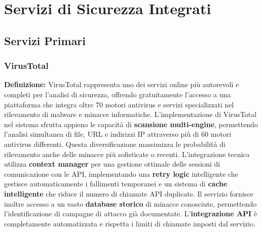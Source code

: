 \documentclass{article}
\begin{document}
\section{Servizi di Sicurezza Integrati}

\subsection{Servizi Primari}

\subsubsection{VirusTotal}
\textbf{Definizione:} VirusTotal rappresenta uno dei servizi online più autorevoli e completi per l'analisi di sicurezza, offrendo gratuitamente l'accesso a una piattaforma che integra oltre 70 motori antivirus e servizi specializzati nel rilevamento di malware e minacce informatiche.
\newline \newline
L'implementazione di VirusTotal nel sistema sfrutta appieno le capacità di \textbf{scansione multi-engine}, permettendo l'analisi simultanea di file, URL e indirizzi IP attraverso più di 60 motori antivirus differenti. Questa diversificazione massimizza le probabilità di rilevamento anche delle minacce più sofisticate o recenti.
\newline \newline
L'integrazione tecnica utilizza \textbf{context manager} per una gestione ottimale delle sessioni di comunicazione con le API, implementando una \textbf{retry logic} intelligente che gestisce automaticamente i fallimenti temporanei e un sistema di \textbf{cache intelligente} che riduce il numero di chiamate API duplicate. Il servizio fornisce inoltre accesso a un vasto \textbf{database storico} di minacce conosciute, permettendo l'identificazione di campagne di attacco già documentate. L'\textbf{integrazione API} è completamente automatizzata e rispetta i limiti di chiamate imposti dal servizio.
\end{document}
